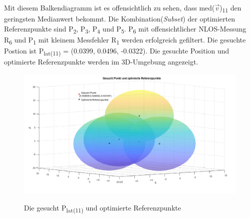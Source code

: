 \noindent
 Mit diesem Balkendiagramm ist es offensichtlich zu sehen, dass med($\vec{v}$)\textsubscript{11} den geringsten Medianwert bekommt. Die Kombination(\textit{Subset}) der optimierten Referenzpunkte sind P\textsubscript{2}, P\textsubscript{3}, P\textsubscript{4} und P\textsubscript{5}. P\textsubscript{6} mit offensichtlicher NLOS-Messung R\textsubscript{6} und P\textsubscript{1} mit kleinem Messfehler R\textsubscript{1} werden erfolgreich gefiltert. Die gesuchte Postion ist P\textsubscript{lat(11)} = (0.0399, 0.0496, -0.0322). Die gesuchte Position und optimierte Referenzpunkte werden im 3D-Umgebung angezeigt.
\begin{figure}[H]
	\centering
	\includegraphics[scale=0.35]{img/LMS_Plat.png}\\
	\caption{Die gesucht P\textsubscript{lat(11)} und optimierte Referenzpunkte}
\end{figure}



